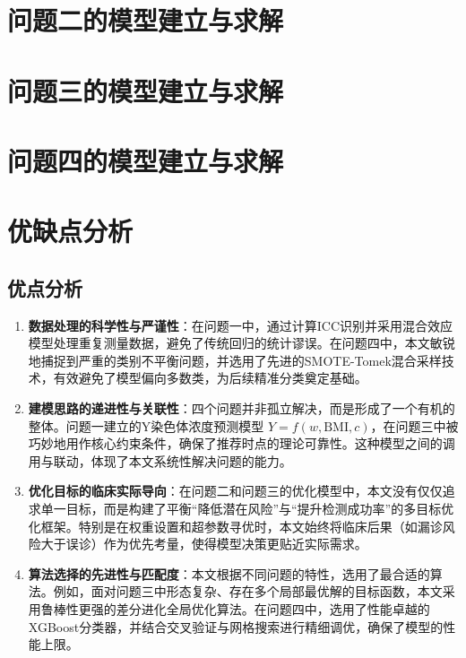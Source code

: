 \documentclass[a4paper, oneside, 12pt]{article}
\begin{document}


\section{问题二的模型建立与求解}



\section{问题三的模型建立与求解}



\section{问题四的模型建立与求解}



\section{优缺点分析}

\subsection{优点分析}
\begin{enumerate}
    \item \textbf{数据处理的科学性与严谨性}：在问题一中，通过计算ICC识别并采用混合效应模型处理重复测量数据，避免了传统回归的统计谬误。在问题四中，本文敏锐地捕捉到严重的类别不平衡问题，并选用了先进的SMOTE-Tomek混合采样技术，有效避免了模型偏向多数类，为后续精准分类奠定基础。

    \item \textbf{建模思路的递进性与关联性}：四个问题并非孤立解决，而是形成了一个有机的整体。问题一建立的Y染色体浓度预测模型 $Y = f(w, \text{BMI}, c)$，在问题三中被巧妙地用作核心约束条件，确保了推荐时点的理论可靠性。这种模型之间的调用与联动，体现了本文系统性解决问题的能力。

    \item \textbf{优化目标的临床实际导向}：在问题二和问题三的优化模型中，本文没有仅仅追求单一目标，而是构建了平衡“降低潜在风险”与“提升检测成功率”的多目标优化框架。特别是在权重设置和超参数寻优时，本文始终将临床后果（如漏诊风险大于误诊）作为优先考量，使得模型决策更贴近实际需求。
    \item \textbf{算法选择的先进性与匹配度}：本文根据不同问题的特性，选用了最合适的算法。例如，面对问题三中形态复杂、存在多个局部最优解的目标函数，本文采用鲁棒性更强的差分进化全局优化算法。在问题四中，选用了性能卓越的XGBoost分类器，并结合交叉验证与网格搜索进行精细调优，确保了模型的性能上限。
\end{enumerate}
\end{document}
